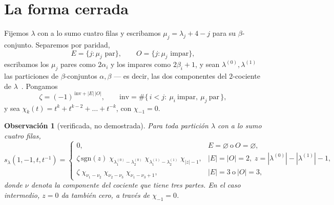 \documentclass[11pt,a4paper]{article}
\newtheorem{observacion}{Observaci\'on}
\begin{document}
\section{La forma cerrada}\label{sec:closedform}

Fijemos $\lambda$ con a lo sumo cuatro filas y escribamos $\mu_j=\lambda_j+4-j$ para su
$\beta$-conjunto. Separemos por paridad,
\[
E=\{j:\mu_j \text{ par}\},\qquad O=\{j:\mu_j\text{ impar}\},
\]
escribamos los $\mu_j$ pares como $2\alpha_i$ y los impares como $2\beta_i+1$, y sean
$\lambda^{(0)},\lambda^{(1)}$ las particiones de $\beta$-conjuntos $\alpha,\beta$ --- es decir,
las dos componentes del $2$-cociente de $\lambda$~\cite[Cap.~I, Ej.~1.8]{Macdonald}. Pongamos
\begin{equation}\label{eq:sign}
\zeta=(-1)^{\,\mathrm{inv}+|E|\,|O|},\qquad
\mathrm{inv}=\#\{\,i<j:\ \mu_i\ \text{impar},\ \mu_j\ \text{par}\,\},
\end{equation}
y sea $\chi_k(t)=t^k+t^{k-2}+\dots+t^{-k}$, con $\chi_{-1}=0$.

\begin{observacion}[verificada, no demostrada]\label{obs:main}
Para toda partici\'on $\lambda$ con a lo sumo cuatro filas,
\begin{equation}\label{eq:closedform}
\boxed{
s_\lambda(1,-1,t,t^{-1})=
\begin{cases}
0, & E=\varnothing\ \text{o}\ O=\varnothing,\\[3pt]
\zeta\,\mathrm{sgn}(z)\;
\chi_{\lambda^{(0)}_1-\lambda^{(0)}_2}\;
\chi_{\lambda^{(1)}_1-\lambda^{(1)}_2}\;
\chi_{|z|-1},
& |E|=|O|=2,\; z=|\lambda^{(0)}|-|\lambda^{(1)}|-1,\\[3pt]
\zeta\;\chi_{\nu_1-\nu_2}\;\chi_{\nu_2-\nu_3}\;\chi_{\nu_1-\nu_3+1},
& |E|=3\ \text{o}\ |O|=3,
\end{cases}}
\end{equation}
donde $\nu$ denota la componente del cociente que tiene tres partes. En el caso intermedio,
$z=0$ da tambi\'en cero, a trav\'es de $\chi_{-1}=0$.
\end{observacion}
\end{document}
